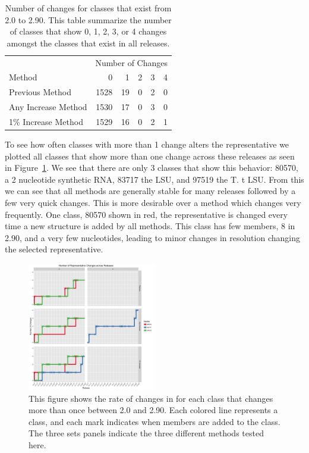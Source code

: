 \begin{table}
  \begin{tabular}{lrrrrr}
    \toprule
                        & \multicolumn{5}{c}{Number of Changes} \\
                          \cmidrule(r){2-6}
    Method              & 0    & 1  &  2 &  3 &  4 \\
    \midrule
    Previous Method     & 1528 & 19 &  0 &  2 &  0 \\
    Any Increase Method & 1530 & 17 &  0 &  3 &  0 \\
    1\% Increase Method & 1529 & 16 &  0 &  2 &  1 \\
    \bottomrule
  \end{tabular}
  \caption{Number of changes for classes that exist from 2.0 to 2.90. This table
    summarize the number of classes that show 0, 1, 2, 3, or 4 changes amongst
  the classes that exist in all releases. }
  \label{tab:rep-changes-count}
\end{table}

To see how often classes with more than 1 change alters the representative we
plotted all classes that show more than one change across these releases as seen
in Figure~\ref{fig:multi-change}. We see that there are only 3 classes that show
this behavior: 80570, a 2 nucleotide synthetic RNA, 83717 the \EC{} LSU, and
97519 the T. t LSU. From this we can see that all methods are generally stable
for many releases followed by a few very quick changes. This is more
desirable over a method which changes very frequently. One class, 80570
shown in red, the representative is changed every time a new structure is
added by all methods. This class has few members, 8 in 2.90, and a very
few nucleotides, leading to minor changes in resolution changing the
selected representative. 

\begin{figure}
  \includegraphics[width=0.5\textwidth]{chapter-4/figs/change-frequency}
  \caption{This figure shows the rate of changes in for each class that changes
    more than once between 2.0 and 2.90. Each colored line represents a class,
    and each mark indicates when members are added to the class. The three sets
  panels indicate the three different methods tested here.}
  \label{fig:multi-change}
\end{figure}

